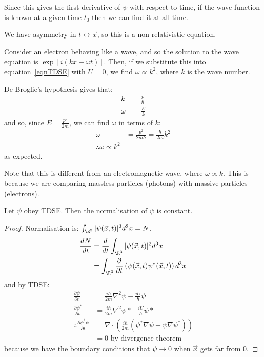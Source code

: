 \documentclass[../Main.tex]{subfiles}
\begin{document}
\begin{remarks}
    \item Since this gives the first derivative of $\psi$ with respect to time, if the wave function is known at a given time $t_0$ then we can find it at all time.
    \item We have asymmetry in $t \leftrightarrow \vec{x}$, so this is a non-relativistic equation.
\end{remarks}
\begin{example}
    Consider an electron behaving like a wave, and so the solution to the wave equation is $\exp\left[i(kx - \omega t)\right]$. Then, if we substitute this into equation~\ref{eqnTDSE} with $U = 0$, we find $\omega \propto k^2$, where $k$ is the wave number.

    De Broglie's hypothesis gives that:
    \begin{align*}
        k &= \frac{p}{\hbar} \\
        \omega &= \frac{E}{k}
    \end{align*}
    and so, since $E = \frac{p^2}{2m}$, we can find $\omega$ in terms of $k$:
    \begin{align*}
        \omega &= \frac{p^2}{2m \hbar} = \frac{\hbar}{2m} k^2 \\
        \therefore \omega \propto k^2
    \end{align*}
    as expected.

    Note that this is different from an electromagnetic wave, where $\omega \propto k$. This is because we are comparing massless particles (photons) with massive particles (electrons).
\end{example}
\begin{proposition}
    Let $\psi$ obey TDSE. Then the normalisation of $\psi$ is constant.
    \label{propConstNormaln}
\end{proposition}
\begin{proof}
    Normalisation is: $\int_{\R^3} |\psi(\vec{x}, t)|^2 d^3x = N$.
    \begin{align*}
        \frac{d^{}N}{dt^{}} &= \frac{d}{dt} \int_{\R^3} |\psi(\vec{x}, t)|^2 d^3x \\
        &= \int_{\R^3} \frac{\partial}{\partial t} \left(\psi(\vec{x}, t) \psi^*(\vec{x}, t)\right) d^3x
    \end{align*}
    and by TDSE:
    \begin{align*}
        \frac{\partial \psi}{\partial t} &= \frac{i \hbar}{2m} \nabla^2 \psi - \frac{iU}{\hbar}\psi \\
        \frac{\partial \psi^*}{\partial t} &= \frac{i \hbar}{2m} \nabla^2 \psi* - \frac{iU}{\hbar}\psi* \\
        \therefore \frac{\partial \psi^* \psi}{\partial t} &= \nabla \cdot \left(\frac{i\hbar}{2m} \left(\psi^* \nabla \psi - \psi \nabla \psi^*\right)\right) \\
        &=0 \text{ by divergence theorem}
    \end{align*}
    because we have the boundary conditions that $\psi \to 0$ when $\vec{x}$ gets far from $0$.
\end{proof}
\end{document}
